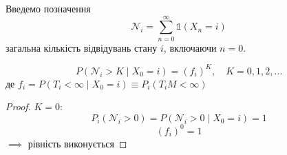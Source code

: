 Введемо позначення
\[ \mathcal{N}_{i} = \sum_{n=0}^{\infty} \mathds{1}\left( X_n = i \right) \] 
загальна кількість відвідувань стану $i$, включаючи $n=0$.

\begin{corollary}
  \[ P\left( \mathcal{N}_{i} > K \mid X_0 = i \right) = \left( f_i \right)^{K}, \quad K = 0, 1, 2, \ldots \]
  де $f_i = P\left( T_i < \infty \mid X_0 = i \right) \equiv P_{i}\left( T_i M< \infty \right) $
\end{corollary}
\begin{proof}
  $K = 0:$
   \[ P_i(\mathcal{N}_i > 0) = P\left( \mathcal{N}_i > 0 \mid  X_0 = i \right) = 1 \] 
   \[ \left( f_i \right) ^{0} = 1 \] 
   $\implies$ рівність виконується
\end{proof}









\hr
